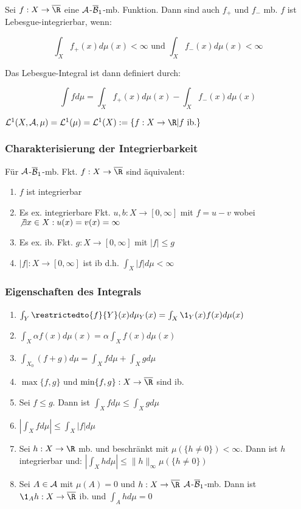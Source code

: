 Sei $f : X \to \overline\R$ eine $\mathcal{A}$-$\overline{\mathcal{B}}_1$-mb. Funktion. Dann sind auch $f_+$ und $f_-$ mb. $f$ ist Lebesgue-integrierbar, wenn:

\vspace{-4mm}
\[ \int_X f_+(x) d\mu(x) < \infty \text{ und } \int_X f_-(x) d\mu(x) < \infty \]

Das Lebesgue-Integral ist dann definiert durch:

\[ \int f d\mu = \int_X f_+(x) d\mu(x) - \int_X f_-(x) d\mu(x) \]

$\L^1(X,\A,\mu) = \L^1(\mu) = \L^1(X) := \{ f : X \to \R | f \text{ ib.}\}$

\subsubsection*{Charakterisierung der Integrierbarkeit}

Für $\mathcal{A}$-$\overline{\mathcal{B}}_1$-mb. Fkt. $f : X \to \overline\R$ sind äquivalent:

\begin{enumerate}[label=(\alph*)]
	\item $f$ ist integrierbar
	\item Es ex. integrierbare Fkt. $u, b : X \to [0,\infty]$ mit $f=u-v$ wobei $\not\exists x \in X : u(x)=v(x)=\infty$
	\item Es ex. ib. Fkt. $g : X \to [0,\infty]$ mit $|f| \leq g$
	\item $|f| : X \to [0,\infty]$ ist ib d.h. $\int_X |f| d\mu < \infty$
\end{enumerate}

\subsubsection*{Eigenschaften des Integrals}

\begin{enumerate}[label=(\alph*)]
	\item $\int_Y \restrictedto{f}{Y}(x) d\mu_Y(x) = \int_X \1_Y(x) f(x) d\mu(x)$
	\item $\int_X \alpha f(x) d\mu(x) = \alpha \int_X f(x) d\mu(x)$
	\item $\int_{X_0} (f + g) d\mu = \int_X f d\mu + \int_X g d\mu$
	\item $\max\{f,g\}$ und $\min\{f,g\} : X \to \overline\R$ sind ib.
	\item Sei $f \leq g$. Dann ist $\int_X f d\mu \leq \int_X g d\mu$
	\item $|\int_X f d\mu| \leq \int_X |f| d\mu$
	\item Sei $h : X \to \R$ mb. und beschränkt mit $\mu(\{h \neq 0\}) < \infty$. Dann ist $h$ integrierbar und: $|\int_X h d\mu| \leq \|h\|_\infty \mu(\{h \neq 0\})$
	\item Sei $A \in \mathcal{A}$ mit $\mu(A) = 0$ und $h : X \to \overline\R$ $\mathcal{A}$-$\overline{\mathcal{B}}_1$-mb. Dann ist $\1_A h : X \to \overline\R$ ib. und $\int_A h d\mu = 0$
\end{enumerate}

